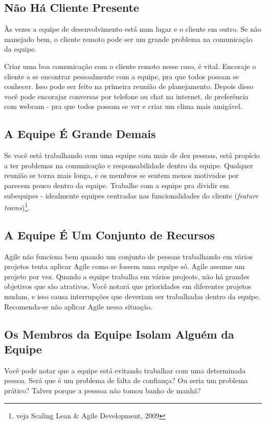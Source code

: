\documentclass[a4paper, 10pt, font=plain]{abnt}
\begin{document}
\subsection{Não Há Cliente Presente}
Às vezes a equipe de desenvolvimento está num lugar e o cliente em outro. Se não manejado bem, o cliente remoto pode ser um grande problema na comunicação da equipe.

Criar uma boa comunicação com o cliente remoto nesse caso, é vital. Encoraje o cliente a se encontrar pessoalmente com a equipe, pra que todos possam se conhecer. Isso pode ser feito na primeira reunião de planejamento. Depois disso você pode encorajar conversas por telefone ou chat na internet, de preferência com webcam - pra que todos possam se ver e criar um clima mais amigável.


\subsection{A Equipe É Grande Demais}
Se você está trabalhando com uma equipe com mais de dez pessoas, está propício a ter problemas na comunicação e responsabilidade dentro da equipe. Qualquer reunião se torna mais longa, e os membros se sentem menos motivados por parecem pouco dentro da equipe. Trabalhe com a equipe pra dividir em subequipes - idealmente equipes centradas nas funcionalidades do cliente (\textit{feature teams})\footnote{veja Scaling Lean \& Agile Development, 2009}.


\subsection{A Equipe É Um Conjunto de Recursos}
Agile não funciona bem quando um conjunto de pessoas trabalhando em vários projetos tenta aplicar Agile como se fossem uma equipe só. Agile assume um projeto por vez. Quando a equipe trabalha em vários projeots, não há grandes objetivos que são atrativos. Você notará que prioridades em diferentes projetos mudam, e isso causa interrupções que deveriam ser trabalhadas dentro da equipe. Recomenda-se não aplicar Agile nessa situação.



\subsection{Os Membros da Equipe Isolam Alguém da Equipe}
Você pode notar que a equipe está evitando trabalhar com uma determinada pessoa. Será que é um problema de falta de confiança? Ou seria um problema prático? Talvez porque a pesssoa não tomou banho de manhã?
\end{document}
